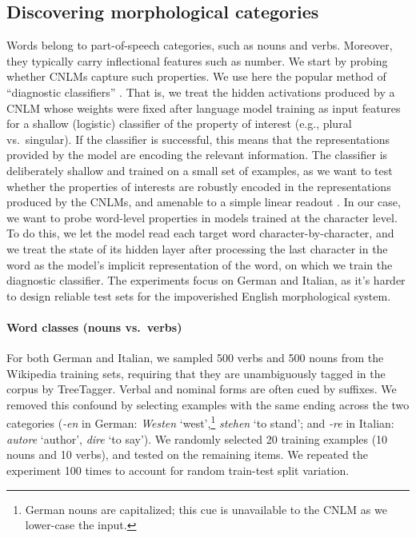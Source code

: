 \subsection{Discovering morphological categories}
\label{sec:categories}

Words belong to part-of-speech categories, such as nouns and
verbs. Moreover, they typically carry inflectional features such as
number. We start by probing whether CNLMs capture such
properties. We use here the popular method of ``diagnostic
classifiers'' \cite{Hupkes:etal:2017}. That is, we treat the hidden
activations produced by a CNLM whose weights were fixed after language
model training as input features for a shallow (logistic) classifier
of the property of interest (e.g., plural vs.~singular). If the
classifier is successful, this means that the representations provided
by the model are encoding the relevant information.  The classifier is
deliberately shallow and trained on a small set of examples, as we
want to test whether the properties of interests are robustly encoded
in the representations produced by the CNLMs, and amenable to a simple
linear readout \cite{Fusi:etal:2016}. In our case, we want to probe
word-level properties in models trained at the character level. To do
this, we let the model read each target word character-by-character,
and we treat the state of its hidden layer after processing the last
character in the word as the model's implicit representation of the
word, on which we train the diagnostic classifier. %
The experiments focus on German and Italian, as it's harder to design
reliable test sets for the impoverished English morphological system.

\paragraph{Word classes (nouns vs.~verbs)}

For both German and Italian, we sampled 500 verbs and 500 nouns from
the Wikipedia training sets, requiring that they are unambiguously
tagged in the corpus by TreeTagger. Verbal and nominal forms are often
cued by suffixes. We removed this confound by selecting examples with
the same ending across the two categories (\emph{-en} in German:
\emph{Westen} `west',\footnote{German nouns are capitalized; this cue
  is unavailable to the CNLM as we lower-case the input.} %
\emph{stehen} `to stand'; and \emph{-re} in Italian: \emph{autore}
`author', \emph{dire} `to say'). We randomly selected 20 training examples
(10 nouns and 10 verbs), and tested on the remaining items.  We
repeated the experiment 100 times to account for random train-test
split variation.

